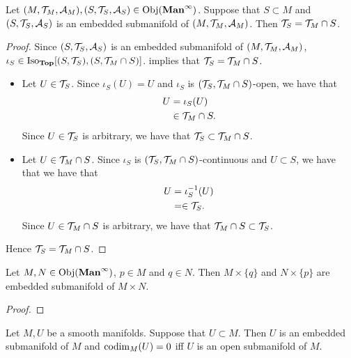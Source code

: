 \documentclass{book}
\begin{document}
	\begin{ex}  
		Let $(M, \mathcal{T}_M, \mathcal{A}_M), (S, \mathcal{T}_S, \mathcal{A}_S) \in \operatorname{Obj}(\operatorname*{\text{\textbf{Man}}^{\infty}})$. Suppose that $S \subset M$ and $(S, \mathcal{T}_S, \mathcal{A}_S)$ is an embedded submanifold of $(M, \mathcal{T}_M, \mathcal{A}_M)$. Then $\mathcal{T}_S = \mathcal{T}_M \cap S$. 
	\end{ex}
	
	\begin{proof}
		Since $(S, \mathcal{T}_S, \mathcal{A}_S)$ is an embedded submanifold of $(M, \mathcal{T}_M, \mathcal{A}_M)$, $\iota_S \in \operatorname{Iso}_{\operatorname*{\text{\textbf{Top}}}}[(S, \mathcal{T}_S), (S, \mathcal{T}_M \cap S)]$.  implies that $\mathcal{T}_S = \mathcal{T}_M \cap S$.
		\begin{itemize}
			\item Let $U \in \mathcal{T}_S$. Since $\iota_S(U) = U$ and $\iota_S$ is $(\mathcal{T}_S, \mathcal{T}_M \cap S)$-open, we have that 
			\begin{align*}
				U 
				& = \iota_S(U) \\
				& \in \mathcal{T}_M \cap S.
			\end{align*}
			Since $U \in \mathcal{T}_S$ is arbitrary, we have that $\mathcal{T}_S \subset \mathcal{T}_M \cap S$.  
			\item Let $U \in \mathcal{T}_M \cap S$. Since $\iota_S$ is $(\mathcal{T}_S, \mathcal{T}_M \cap S)$-continuous and $U \subset S$, we have that we have that 
			\begin{align*}
				U
				& = \iota_S^{-1}(U) \\
				& = \in \mathcal{T}_S.
			\end{align*}
			Since $U \in \mathcal{T}_M \cap S$ is arbitrary, we have that  $\mathcal{T}_M \cap S \subset \mathcal{T}_S$. 
		\end{itemize}
		Hence $\mathcal{T}_S = \mathcal{T}_M \cap S$. 
	\end{proof}

	\begin{ex} 
		Let $M, N \in \operatorname{Obj}(\operatorname*{\text{\textbf{Man}}^{\infty}})$, $p \in M$ and $q \in N$. Then $M \times \{q\}$ and $N \times \{p\}$ are embedded submanifold of $M \times N$. 
	\end{ex}

	\begin{proof}
	\end{proof}

	\begin{ex} 
		Let $M, U$ be a smooth manifolds. Suppose that $U \subset M$. Then $U$ is an embedded submanifold of $M$ and $\operatorname{codim}_M(U) = 0$ iff $U$ is an open submanifold of $M$. 
	\end{ex}
\end{document}
